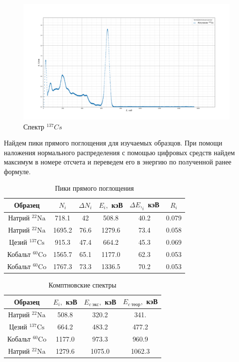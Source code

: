 \documentclass[a4paper,12pt]{article} %
\begin{document}
	\begin{figure}[H]
		\centering
		\includegraphics[width=0.95\linewidth]{Cs_137}
		\caption{Спектр $^{137}Cs$}
		\label{fig:cs137}
	\end{figure}
	Найдем пики прямого поглощения для изучаемых образцов. При помощи наложения нормального распределения с помощью цифровых средств найдем максимум в номере отсчета и переведем его в энергию по полученной ранее формуле.
	\begin{table}[H]
		\caption{Пики прямого поглощения}
		\begin{center}
			\begin{tabular}{|c|c|c|c|c|c|}
				\hline 
				Образец & $N_i $ & $ \Delta N_i $ & $ E_i, $ кэВ & $ \Delta E,_i $ кэВ  & $ R_i $ \\ 
				\hline 
				Натрий $ \mathrm{^{22}Na} $ & 718.1 & 42 & 508.8 & 40.2 & 0.079 \\
				Натрий $ \mathrm{^{22}Na} $& 1695.2 & 76.6 & 1279.6 & 73.4 & 0.058 \\
				Цезий $ \mathrm{^{137}Cs} $ & 915.3 & 47.4 & 664.2 & 45.3 & 0.069 \\
				Кобальт $ \mathrm{^{60}Co} $ & 1565.7 & 65.1 & 1177.0 & 62.3 & 0.053 \\
				Кобальт $ \mathrm{^{60}Co} $ & 1767.3 & 73.3 & 1336.5 & 70.2 & 0.053 \\
				
				
				\hline 
			\end{tabular} 
		\end{center}
		\label{res}
	\end{table}

	\begin{table}[H]
		\caption{Комптновские спектры}
		\begin{center}
			\begin{tabular}{|c|c|c|c|}
				\hline 
				Образец & $ E_i, $ кэВ  & $ E_{c\; экс}, $ кэВ  & $ E_{c \; теор}, $ кэВ \\
				\hline 
				Натрий $ \mathrm{^{22}Na} $ & 508.8 & 320.2 & 341. \\
				Цезий $ \mathrm{^{137}Cs} $ & 664.2 & 483.2 & 477.2 \\
				Кобальт $ \mathrm{^{60}Co} $ & 1177.0 & 973.3 & 960.9 \\
				Натрий $ \mathrm{^{22}Na} $& 1279.6 & 1075.0 & 1062.3 \\
				\hline 
			\end{tabular} 
		\end{center}
		\label{compt}
	\end{table}
	
\end{document}
